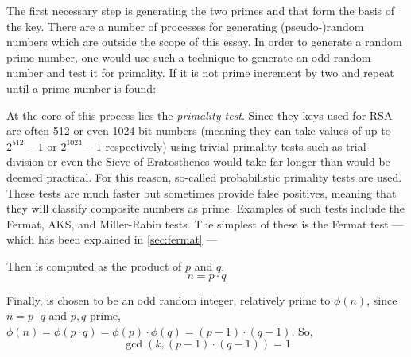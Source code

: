 \documentclass[12pt, titlepage]{article}
\begin{document}
The first necessary step is generating the two primes  and  that form the
basis of the key. There are a number of processes for generating (pseudo-)random numbers
which are outside the scope of this essay. In order to generate a random prime number, one
would use such a technique to generate an odd random number and test it for primality.  If
it is not prime increment by two and repeat until a prime number is found:
%
\begin{figure}[H]
\end{figure}
%
At the core of this process lies the \emph{primality test}. Since they keys used for RSA are
often 512 or even 1024 bit numbers (meaning they can take values of up to $2^{512} - 1$ or
$2^{1024} - 1$ respectively) using trivial primality tests such as trial division or even
the Sieve of Eratosthenes would take far longer than would be deemed practical.  For this
reason, so-called probabilistic primality tests are used. These tests are much faster but
sometimes provide false positives, meaning that they will classify composite numbers as
prime. Examples of such tests include the Fermat, AKS, and Miller-Rabin tests. The simplest
of these is the Fermat test --- which has been explained in \autoref{sec:fermat} --- 

Then  is computed as the product of $p$ and $q$. $$n=p \cdot q$$

Finally,  is chosen to be an odd random integer, relatively prime to $\phi(n)$,
since $n=p \cdot q$ and $p,q$ prime, $\phi(n) = \phi(p \cdot q) = \phi(p) \cdot \phi(q) =
(p-1) \cdot (q-1)$. So, 
%
\begin{equation*}
    \gcd(k, (p-1) \cdot (q-1)) = 1
\end{equation*}
%
\end{document}
